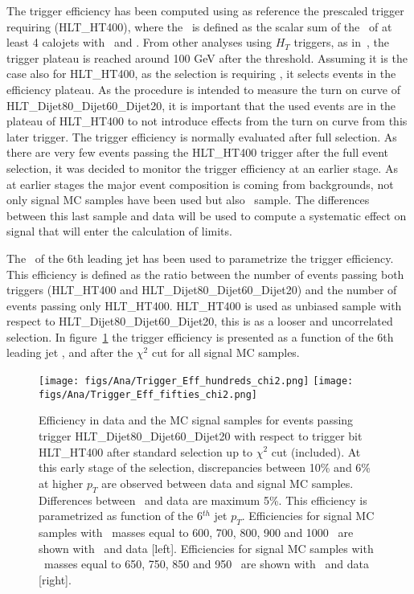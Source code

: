 The trigger efficiency has been computed using as reference the prescaled trigger requiring  (HLT\_HT400), where the \HT~is defined as the scalar sum of the \pt~of at least 4 calojets with ~and . From other analyses using $H_{T}$ triggers, as in~\cite{Khachatryan:2015axa}, the trigger plateau is reached around 100 GeV after the threshold. Assuming it is the case also for HLT\_HT400, as the selection is requiring , it selects events in the efficiency plateau. As the procedure is intended to measure the turn on curve of HLT\_Dijet80\_Dijet60\_Dijet20, it is important that the used events are in the plateau of HLT\_HT400 to not introduce effects from the turn on curve from this later trigger. The trigger efficiency is normally evaluated after full selection. As there are very few events passing the HLT\_HT400 trigger after the full event selection, it was decided to monitor the trigger efficiency at an earlier stage. As at earlier stages the major event composition is coming from backgrounds, not only signal MC samples have been used but also \ttbar~sample. The differences between this last sample and data will be used to compute a systematic effect on signal that will enter the calculation of limits.

The \pt~of the 6th leading jet has been used to parametrize the trigger efficiency. This efficiency is defined as the ratio between the number of events passing both triggers (HLT\_HT400 and HLT\_Dijet80\_Dijet60\_Dijet20) and the number of events passing only HLT\_HT400. HLT\_HT400 is used as unbiased sample with respect to HLT\_Dijet80\_Dijet60\_Dijet20, this is as a looser and uncorrelated selection. In figure~\ref{fig:TrigEff} the trigger efficiency is presented as a function of the 6th leading jet \pt, and after the $\chi^{2}$ cut for all signal MC samples. 

\begin{figure}[!Hhtbp]
  \begin{center}
    \texttt{[image: figs/Ana/Trigger\_Eff\_hundreds\_chi2.png]}
    \texttt{[image: figs/Ana/Trigger\_Eff\_fifties\_chi2.png]}
    \caption{Efficiency in data and the MC signal samples for events passing trigger HLT\_Dijet80\_Dijet60\_Dijet20 with respect to trigger bit HLT\_HT400 after standard selection up to $\chi^{2}$ cut (included). At this early stage of the selection, discrepancies between 10\% and 6\% at higher $p_{T}$ are observed between data and signal MC samples. Differences between \ttbar~and data are maximum 5\%. This efficiency is parametrized as function of the 6$^{th}$ jet $p_{T}$. Efficiencies for signal MC samples with \Tp~masses equal to 600, 700, 800, 900 and 1000 \GeVcc~are shown with \ttbar~and data [left]. Efficiencies for signal MC samples with \Tp~masses equal to 650, 750, 850 and 950 \GeVcc~are shown with \ttbar~and data [right].}
    \label{fig:TrigEff}
  \end{center}
\end{figure}

